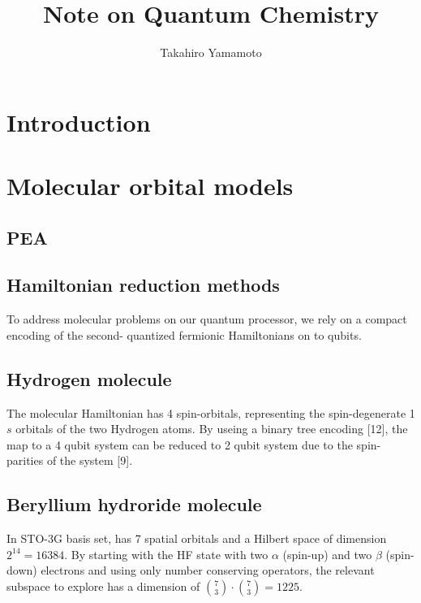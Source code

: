 \documentclass[11pt, oneside]{article}   	%
\title{Note on Quantum Chemistry}
\author{Takahiro Yamamoto}
\begin{document}
\maketitle
\section{Introduction}
\section{Molecular orbital models}
\subsection{PEA}
\subsection{Hamiltonian reduction methods}
To address molecular problems on our quantum processor, we rely on a compact encoding of the second- quantized fermionic Hamiltonians on to qubits. 

\subsection{Hydrogen molecule}
The  molecular Hamiltonian has 4 spin-orbitals, representing the spin-degenerate 1$s$ orbitals of the two Hydrogen atoms. 
By useing a binary tree encoding [12], the map to a 4 qubit system can be reduced to 2 qubit system due to the spin-parities of the system [9]. 

\subsection{Beryllium hydroride molecule}
In STO-3G basis set,  has 7 spatial orbitals and a Hilbert space of dimension $2^{14} = 16384$. 
By starting with the HF state with two $\alpha$ (spin-up) and two $\beta$ (spin-down) electrons and using only number conserving operators, the relevant subspace to explore has a dimension of 
$\binom{7}{3} \cdot \binom{7}{3} = 1225$. 
\end{document}
